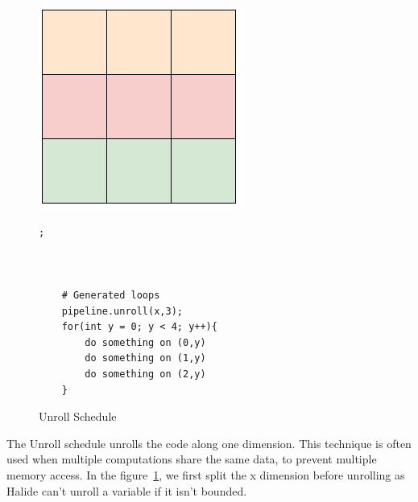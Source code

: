 \begin{figure}[H]
		\begin{minipage}[c]{\EIW}
			\centering
		\includegraphics[width=\textwidth]{Images/Unroll.png}
		\end{minipage}
		\begin{minipage}[c]{\ECW}
			\centering
			\begin{lstlisting}[label={code:reorder}];



	# Generated loops
	pipeline.unroll(x,3);
	for(int y = 0; y < 4; y++){
		do something on (0,y)
		do something on (1,y)
		do something on (2,y)
	}

\end{lstlisting}
		\end{minipage}
	\caption{Unroll Schedule}
	\label{schedule:unroll}
\end{figure}
	The Unroll schedule unrolls the code along one dimension. This technique is often used when multiple computations share the same data, to prevent multiple memory access. In the figure~\ref{schedule:unroll}, we first  split the x dimension before unrolling as Halide can't unroll a variable if it isn't bounded.

